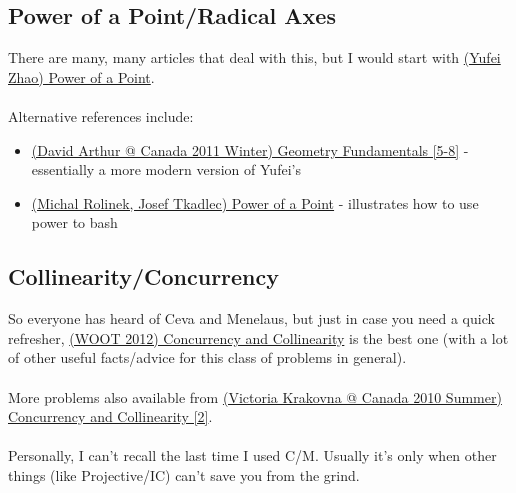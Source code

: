 	\subsection{Power of a Point/Radical Axes}
	There are many, many articles that deal with this, but I would start with \href{run:./F_Geometry/(Yufei Zhao) Power of a Point.pdf}{(Yufei Zhao) Power of a Point}.\\\\
	Alternative references include:
	\begin{itemize}
	\item \href{run:./F_Geometry/(David Arthur @ Canada 2011 Winter) Geometry Fundamentals.pdf}{(David Arthur @ Canada 2011 Winter) Geometry Fundamentals [5-8]} - essentially a more modern version of Yufei's
	\item \href{run:./F_Geometry/(Michal Rolinek, Josef Tkadlec) Power of a Point.pdf}{(Michal Rolinek, Josef Tkadlec) Power of a Point} - illustrates how to use power to bash
	\end{itemize}
%
	\subsection{Collinearity/Concurrency}
	So everyone has heard of Ceva and Menelaus, but just in case you need a quick refresher, \href{run:./F_geometry/(WOOT 2012) Concurrency and Collinearity.pdf}{(WOOT 2012) Concurrency and Collinearity} is the best one (with a lot of other useful facts/advice for this class of problems in general).\\\\More problems also available from \href{run:./F_geometry/(Victoria Krakovna @ Canada 2010 Summer) Concurrency and Collinearity.pdf}{(Victoria Krakovna @ Canada 2010 Summer) Concurrency and Collinearity [2]}.\\\\
	Personally, I can't recall the last time I used C/M. Usually it's only when other things (like Projective/IC) can't save you from the grind.
%
